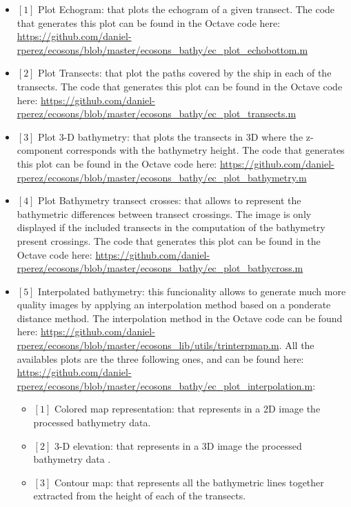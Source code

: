 \documentclass{article}[a4paper, 12pt]
\begin{document}
\begin{itemize}
    \item $[1]$ Plot Echogram: that plots the echogram of a given transect. The code that generates this plot can be found in the Octave code here: \url{https://github.com/daniel-rperez/ecosons/blob/master/ecosons_bathy/ec_plot_echobottom.m}
    \item $[2]$ Plot Transects: that plot the paths covered by the ship in each of the transects. The code that generates this plot can be found in the Octave code here: \url{https://github.com/daniel-rperez/ecosons/blob/master/ecosons_bathy/ec_plot_transects.m}
    \item $[3]$ Plot 3-D bathymetry: that plots the transects in 3D where the z-component corresponds with the bathymetry height. The code that generates this plot can be found in the Octave code here: \url{https://github.com/daniel-rperez/ecosons/blob/master/ecosons_bathy/ec_plot_bathymetry.m}
    \item $[4]$ Plot Bathymetry transect crosses: that allows to represent the bathymetric differences between transect crossings. The image is only displayed if the included transects in the computation of the bathymetry present crossings. The code that generates this plot can be found in the Octave code here: \url{https://github.com/daniel-rperez/ecosons/blob/master/ecosons_bathy/ec_plot_bathycross.m}
    \item $[5]$ Interpolated bathymetry: this funcionality allows to generate much more quality images by applying an interpolation method based on a ponderate distance method. The interpolation method in the Octave code can be found here: \url{https://github.com/daniel-rperez/ecosons/blob/master/ecosons_lib/utils/trinterpmap.m}. All the availables plots are the three following ones, and can be found here: \url{https://github.com/daniel-rperez/ecosons/blob/master/ecosons_bathy/ec_plot_interpolation.m}:
    \begin{itemize}
        \item $[1]$ Colored map representation: that represents in a 2D image the processed bathymetry data.
        \item $[2]$ 3-D elevation: that represents in a 3D image the processed bathymetry data .
        \item $[3]$ Contour map: that represents all the bathymetric lines together extracted from the height of each of the transects.
    \end{itemize} 
\end{itemize}
\end{document}
